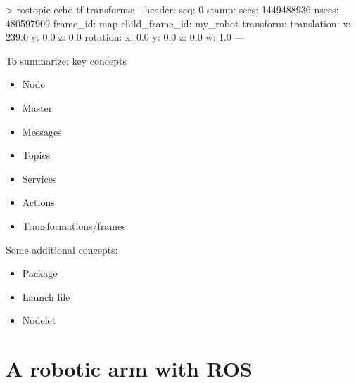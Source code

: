 \documentclass[compress]{beamer}
\begin{document}
%
%
%
%

\begin{frame}[containsverbatim]{}
\begin{shcode}
> rostopic echo tf
transforms: 
  - 
    header: 
      seq: 0
      stamp: 
        secs: 1449488936
        nsecs: 480597909
      frame_id: map
    child_frame_id: my_robot
    transform: 
      translation: 
        x: 239.0
        y: 0.0
        z: 0.0
      rotation: 
        x: 0.0
        y: 0.0
        z: 0.0
        w: 1.0
---

\end{shcode}

\end{frame}

\begin{frame}{To summarize: key concepts}
    \begin{itemize}
        \item Node
        \item Master
        \item Messages
        \item Topics
        \item Services
        \item Actions
        \item Transformations/frames
    \end{itemize}

    \pause

    Some additional concepts:
    \begin{itemize}
        \item Package
        \item Launch file
        \item Nodelet
    \end{itemize}
\end{frame}


\section[Robot arm]{A robotic arm with ROS}
\end{document}
